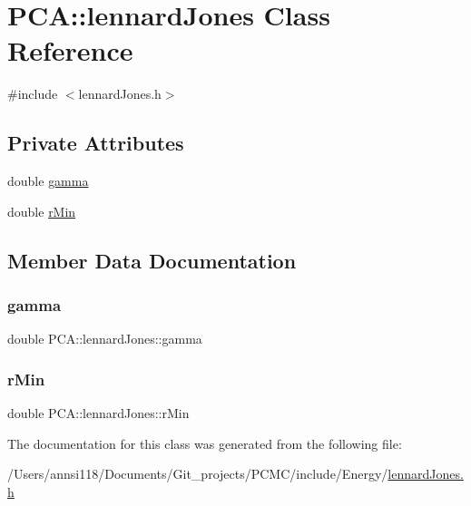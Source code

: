 \hypertarget{class_p_c_a_1_1lennard_jones}{}\section{P\+CA\+:\+:lennard\+Jones Class Reference}
\label{class_p_c_a_1_1lennard_jones}


{\ttfamily \#include $<$lennard\+Jones.\+h$>$}

\subsection*{Private Attributes}
\begin{DoxyCompactItemize}
\item 
double \hyperlink{class_p_c_a_1_1lennard_jones_ad696584256b66e970fdd4b963ffbf0fe}{gamma}
\item 
double \hyperlink{class_p_c_a_1_1lennard_jones_a96222c4266786b9dafa23301034e2fb6}{r\+Min}
\end{DoxyCompactItemize}


\subsection{Member Data Documentation}
\hypertarget{class_p_c_a_1_1lennard_jones_ad696584256b66e970fdd4b963ffbf0fe}{}\label{class_p_c_a_1_1lennard_jones_ad696584256b66e970fdd4b963ffbf0fe} 
\subsubsection{\texorpdfstring{gamma}{gamma}}
{\footnotesize\ttfamily double P\+C\+A\+::lennard\+Jones\+::gamma\hspace{0.3cm}{\ttfamily [private]}}

\hypertarget{class_p_c_a_1_1lennard_jones_a96222c4266786b9dafa23301034e2fb6}{}\label{class_p_c_a_1_1lennard_jones_a96222c4266786b9dafa23301034e2fb6} 
\subsubsection{\texorpdfstring{r\+Min}{rMin}}
{\footnotesize\ttfamily double P\+C\+A\+::lennard\+Jones\+::r\+Min\hspace{0.3cm}{\ttfamily [private]}}



The documentation for this class was generated from the following file\+:\begin{DoxyCompactItemize}
\item 
/\+Users/annsi118/\+Documents/\+Git\+\_\+projects/\+P\+C\+M\+C/include/\+Energy/\hyperlink{lennard_jones_8h}{lennard\+Jones.\+h}\end{DoxyCompactItemize}
